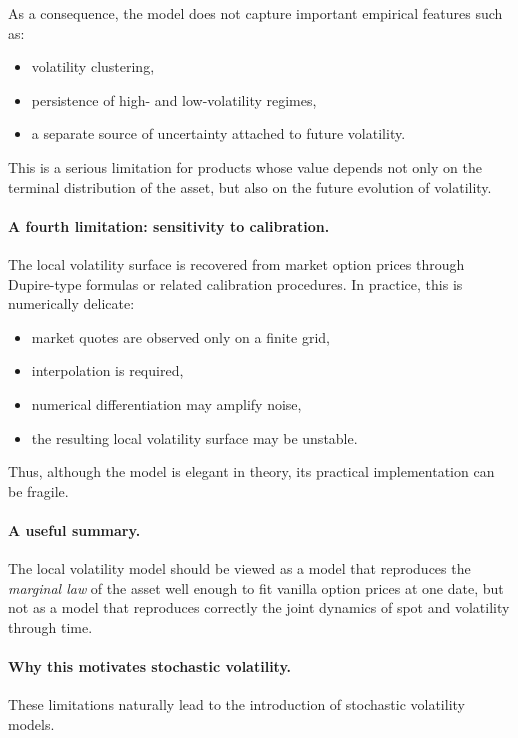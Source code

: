 \documentclass[11pt]{article}
\theoremstyle{plain}
\theoremstyle{definition}
\theoremstyle{remark}
\begin{document}
As a consequence, the model does not capture important empirical
features such as:
\begin{itemize}[leftmargin=1.4em]
    \item volatility clustering,
    \item persistence of high- and low-volatility regimes,
    \item a separate source of uncertainty attached to future volatility.
\end{itemize}

This is a serious limitation for products whose value depends not only
on the terminal distribution of the asset, but also on the future
evolution of volatility.

\paragraph{A fourth limitation: sensitivity to calibration.}
The local volatility surface is recovered from market option prices
through Dupire-type formulas or related calibration procedures.
In practice, this is numerically delicate:
\begin{itemize}[leftmargin=1.4em]
    \item market quotes are observed only on a finite grid,
    \item interpolation is required,
    \item numerical differentiation may amplify noise,
    \item the resulting local volatility surface may be unstable.
\end{itemize}

Thus, although the model is elegant in theory, its practical
implementation can be fragile.

\paragraph{A useful summary.}
The local volatility model should be viewed as a model that reproduces
the \emph{marginal law} of the asset well enough to fit vanilla option
prices at one date, but not as a model that reproduces correctly the
joint dynamics of spot and volatility through time.

\paragraph{Why this motivates stochastic volatility.}
These limitations naturally lead to the introduction of stochastic
volatility models.
\end{document}
